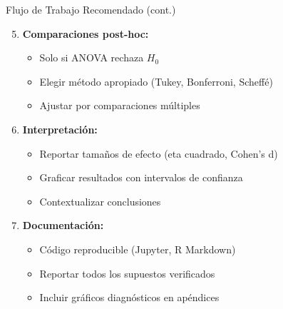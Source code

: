 \documentclass[aspectratio=169]{beamer}
\begin{document}
\begin{frame}{Flujo de Trabajo Recomendado (cont.)}
\begin{enumerate}
\setcounter{enumi}{4}
\item \textbf{Comparaciones post-hoc:}
\begin{itemize}
\item Solo si ANOVA rechaza $H_0$
\item Elegir método apropiado (Tukey, Bonferroni, Scheffé)
\item Ajustar por comparaciones múltiples
\end{itemize}

\vspace{0.2cm}

\item \textbf{Interpretación:}
\begin{itemize}
\item Reportar tamaños de efecto (eta cuadrado, Cohen's d)
\item Graficar resultados con intervalos de confianza
\item Contextualizar conclusiones
\end{itemize}

\vspace{0.2cm}

\item \textbf{Documentación:}
\begin{itemize}
\item Código reproducible (Jupyter, R Markdown)
\item Reportar todos los supuestos verificados
\item Incluir gráficos diagnósticos en apéndices
\end{itemize}
\end{enumerate}
\end{frame}
\end{document}
